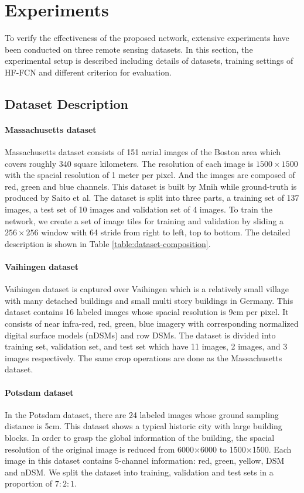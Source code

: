 \section{Experiments}
\label{Sec:exp}

To verify the effectiveness of the proposed network, extensive experiments have been conducted on three remote sensing datasets. In this section, the experimental setup is described including details of datasets, training settings of HF-FCN and different criterion for evaluation.


\subsection{Dataset Description}

\paragraph{Massachusetts dataset}
%
Massachusetts dataset consists of 151 aerial images of the Boston area which covers roughly 340 square kilometers.
The resolution of each image is $1500\times 1500$ with the spacial resolution of 1 meter per pixel. And the images are composed of red, green and blue channels.
This dataset is built by Mnih while ground-truth is produced by Saito et al.
The dataset is split into three parts,  a training set of 137 images, a test set of 10 images and validation set of 4 images.
To train the network, we create a set of image tiles for training and validation by sliding a ${256\times256}$ window with 64 stride from right to left, top to bottom. The detailed description is shown in Table \ref{table:dataset-composition}.

\paragraph{Vaihingen dataset}
%
Vaihingen dataset is captured over Vaihingen which is a relatively small village with many detached buildings and small multi story buildings in Germany.
This dataset contains 16 labeled images whose spacial resolution is 9cm per pixel.
It consists of near infra-red, red, green, blue imagery with corresponding normalized digital surface models (nDSMs) and row DSMs. The dataset is divided into training set, validation set, and test set which have 11 images, 2 images, and 3 images respectively. The same crop operations are done as the Massachusetts dataset.

\paragraph{Potsdam dataset}
%
In the Potsdam dataset, there are 24 labeled images whose ground sampling distance is 5cm.
This dataset shows a typical historic city with large building blocks. In order to grasp the global information of the building, the spacial resolution of the original image is reduced from 6000$\times$6000 to 1500$\times$1500.
Each image in this dataset contains 5-channel information: red, green, yellow, DSM and nDSM.
We split the dataset into training, validation and test sets in a proportion of $7:2:1$.



